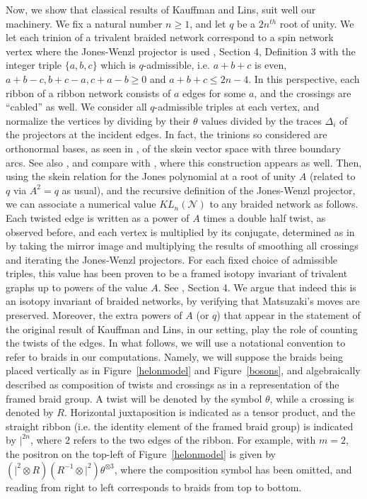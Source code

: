 \documentclass[aps,nofootinbib,amsfonts,superscriptaddress]{revtex4}
\begin{document}
Now, we show that classical results of Kauffman and Lins, suit well our machinery. We fix a natural number $n\geq 1$, and let $q$ be a $2n^{th}$ root of unity. We let each trinion of a trivalent braided network correspond to a spin network vertex where the Jones-Wenzl projector is used \cite{KL}, Section 4, Definition 3 with the integer triple $\{a, b, c\}$ which is $q$-admissible, i.e. $a+b+c$ is even, $a+b-c, b+c-a, c+a-b\geq 0$ and $a+b+c \leq 2n -4$. In this perspective, each ribbon of a ribbon network consists of $a$ edges for some $a$, and the crossings are ``cabled'' as well. We consider all $q$-admissible triples at each vertex, and normalize the vertices by dividing by their $\theta$ values divided by the traces $\Delta_i$ of the projectors at the incident edges. In fact, the trinions so considered are orthonormal bases, as seen in \cite{Lick2}, of the skein vector space with three boundary arcs. See also \cite{Yokota}, and compare with \cite{Handlebodies}, where this construction appears as well. 
 Then, using the skein relation for the Jones polynomial at a root of unity $A$ (related to $q$ via $A^2 = q$ as usual), and the recursive definition of the Jones-Wenzl projector, we can associate a numerical value $KL_n (\mathcal N)$ to any braided network as follows. Each twisted edge is written as a power of $A$ times a double half twist, as observed before, and each vertex is multiplied by its conjugate, determined as in \cite{Lick2,Yokota} by taking the mirror image and multiplying the results of smoothing all crossings and iterating the Jones-Wenzl projectors. For each fixed choice of admissible triples, this value has been proven to be a framed isotopy invariant of trivalent graphs up to powers of the value $A$. See \cite{KL}, Section 4. We argue that indeed this is an isotopy invariant of braided networks, by verifying that Matsuzaki's moves are preserved. Moreover, the extra powers of $A$ (or $q$) that appear in the statement of the original result of Kauffman and Lins, in our setting, play the role of counting the twists of the edges. In what follows, we will use a notational convention to refer to braids in our computations. Namely, we will suppose the braids being placed vertically as in Figure~\ref{helonmodel} and Figure~\ref{bosons}, and algebraically described as composition of twists  and crossings as in a representation of the framed braid group. A twist will be denoted by the symbol $\theta$, while a crossing is denoted by $R$. Horizontal juxtaposition is indicated as a tensor product, and the straight ribbon (i.e. the identity element of the framed braid group) is indicated by $|^{2n}$, where $2$ refers to the two edges of the ribbon. For example, with $m=2$, the positron on the top-left of Figure~\ref{helonmodel} is given by $(|^2\otimes R)(R^{-1}\otimes |^2)\theta^{\otimes 3}$, where the composition symbol has been omitted, and reading from right to left corresponds to braids from top to bottom. \\
\end{document}
